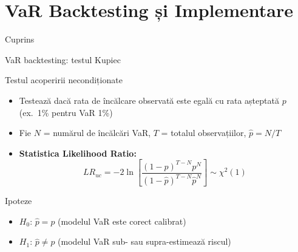 \documentclass[9pt, aspectratio=169, t]{beamer}
\begin{document}
\section{VaR Backtesting și Implementare}

\begin{frame}{Cuprins}
    \small
    \vspace{-0.2cm}
    \tableofcontents[currentsection]
\end{frame}

\begin{frame}{VaR backtesting: testul Kupiec}
    \small
    \begin{block}{Testul acoperirii necondiționate}
        \begin{itemize}
            \item Testează dacă rata de încălcare observată este egală cu rata așteptată $p$ (ex.\ 1\% pentru VaR 1\%)
            \item Fie $N$ = numărul de încălcări VaR, $T$ = totalul observațiilor, $\hat{p} = N/T$
            \item \textbf{Statistica Likelihood Ratio:}
            \[
                LR_{uc} = -2\ln\left[\frac{(1-p)^{T-N} p^N}{(1-\hat{p})^{T-N} \hat{p}^N}\right] \sim \chi^2(1)
            \]
        \end{itemize}
    \end{block}

    \vspace{0.2cm}

    \begin{alertblock}{Ipoteze}
        \begin{itemize}
            \item $H_0$: $\hat{p} = p$ (modelul VaR este corect calibrat)
            \item $H_1$: $\hat{p} \neq p$ (modelul VaR sub- sau supra-estimează riscul)
        \end{itemize}
    \end{alertblock}
\end{frame}
\end{document}
